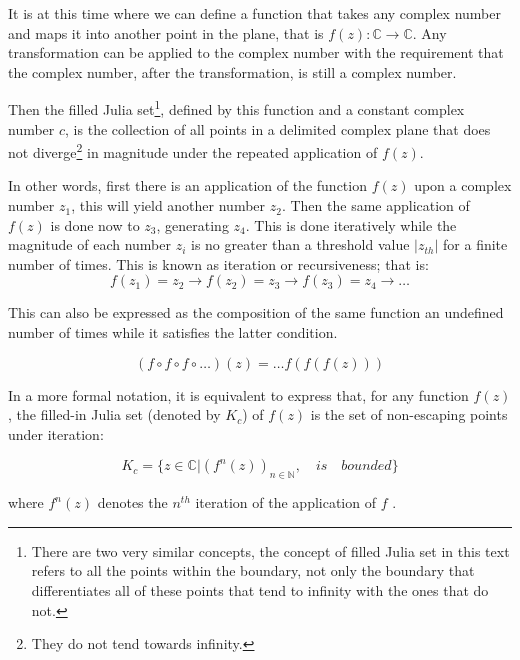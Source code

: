 \documentclass{article}
\begin{document}
It is at this time where we can define a function that takes any complex number and maps it into another point in the plane, that is $f(z):\mathbb{C}\rightarrow \mathbb{C}$. Any transformation can be applied to the complex number with the requirement that the complex number, after the transformation, is still a complex number.

Then the filled Julia set\footnote{There are two very similar concepts, the concept of filled Julia set in this text refers to all the points within the boundary,  not only the boundary that differentiates all of these points that tend to infinity with the ones that do not.}, defined by this function and a constant complex number $c$, is the collection of all points in a delimited complex plane that does not diverge\footnote{They do not tend towards infinity.} in magnitude under the repeated application of $f(z)$\cite{csc}.

In other words, first there is an application of the function $f(z)$ upon a complex number $z_1$, this will yield another number $z_2$. Then the same application of $f(z)$ is done now to $z_3$, generating $z_4$. This is done iteratively while the magnitude of each number $z_i$ is no greater than a threshold value $|z_{th}|$ for a finite number of times\cite{coursera}. This is known as iteration or recursiveness; that is:
\begin{equation}
    f(z_1)=z_2 \longrightarrow f(z_2)=z_3 \longrightarrow f(z_3)=z_4 \longrightarrow \dots
\end{equation}

This can also be expressed as the composition of the same function an undefined number of times while it satisfies the latter condition.

\begin{equation}
    (f\circ f \circ f \circ \dots )(z) = \dots f(f(f(z)))
\end{equation}

In a more formal notation, it is equivalent to express that, for any function $f(z)$, the filled-in Julia set (denoted by $K_c$) of $f(z)$ is the set of non-escaping points under iteration:

\begin{equation}
    K_c = \{z \in \mathbb{C}| (f^n(z))_{n \in \mathbb{N}}, \quad is \quad bounded\}
\end{equation}

where $f^n(z)$ denotes the $n^{th}$ iteration of the application of $f$ \cite{Lei}.

\newpage
\end{document}
